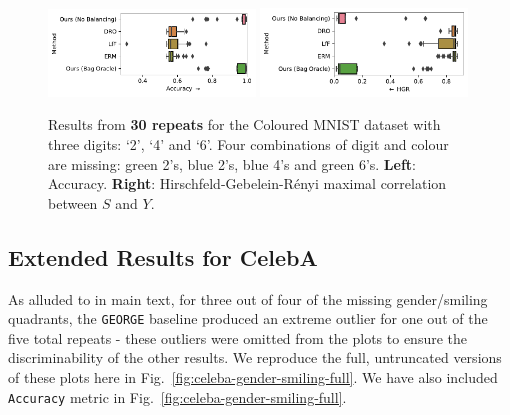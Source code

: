 \begin{figure}[htp]
  \centering
  \includegraphics[width=0.49\textwidth]{supmatch/figures/cmnist/supmat/cmnist_3dig_4miss_acc.pdf}
  \includegraphics[width=0.49\textwidth]{supmatch/figures/cmnist/supmat/cmnist_3dig_4miss_hgr.pdf}
  \caption{
    Results from \textbf{30 repeats} for the Coloured MNIST dataset with three digits: `2', `4' and
    `6'. Four combinations of digit and colour are missing: {\color{green}green} 2's,
    {\color{blue}blue} 2's, {\color{blue}blue} 4's and {\color{green}green} 6's. \textbf{Left}:
    Accuracy. \textbf{Right}: Hirschfeld-Gebelein-R\'enyi maximal correlation
    \cite{renyi1959measures} between $S$ and $Y$.
  }%
  \label{fig:cmnist-3dig-4miss}
\end{figure}
%
\subsection{Extended Results for CelebA}\label{ssec:extended-results-celeba}
%
As alluded to in main text, for three out of four of the missing gender/smiling quadrants, the
\texttt{GEORGE} baseline produced an extreme outlier for one out of the five total repeats - these
outliers were omitted from the plots to ensure the discriminability of the other results.
%
We reproduce the full, untruncated versions of these plots here in
Fig.~\ref{fig:celeba-gender-smiling-full}. We have also included \texttt{Accuracy} metric in
Fig.~\ref{fig:celeba-gender-smiling-full}.


